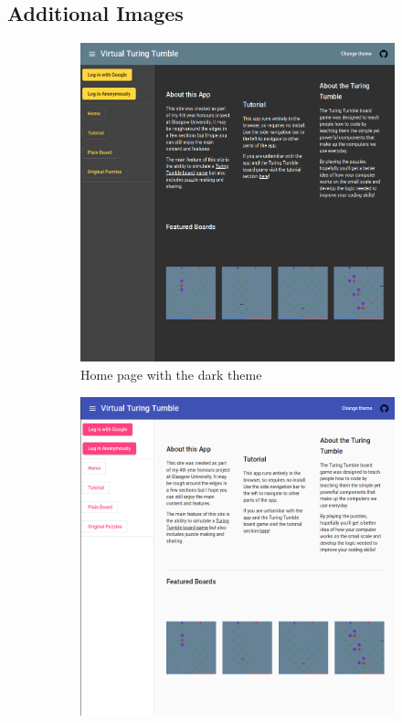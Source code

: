 \documentclass{l4proj}
\begin{document}
\begin{appendices}
\section{Additional Images}
\begin{figure}[h]
    \centering
    \begin{subfigure}[b]{0.6\textwidth}
        \includegraphics[width=\textwidth]{images/darkTheme.png}
        \caption{Home page with the dark theme}
        \label{fig:homepageDark}
    \end{subfigure}
    \begin{subfigure}[b]{0.6\textwidth}
        \includegraphics[width=\textwidth]{images/lightTheme.png}

\end{subfigure}
\end{figure}
\end{appendices}
\end{document}
